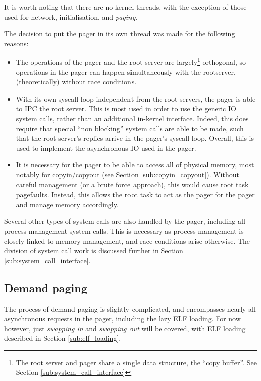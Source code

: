 \documentclass[12pt,english]{article}
\begin{document}
It is worth noting that there are no kernel threads, with the exception of those used for network, initialisation, and \emph{paging}.

The decision to put the pager in its own thread was made for the following reasons:
\begin{itemize}
\item The operations of the pager and the root server are largely\footnote{The root server and pager share a single data structure, the ``copy buffer''.  See Section \ref{sub:system_call_interface}} orthogonal, so operations in the pager can happen simultaneously with the rootserver, (theoretically) without race conditions.
\item With its own syscall loop independent from the root servers, the pager is able to IPC the root server.  This is most used in order to use the generic IO system calls, rather than an additional in-kernel interface.  Indeed, this does require that special ``non blocking'' system calls are able to be made, such that the root server's replies arrive in the pager's syscall loop.  Overall, this is used to implement the asynchronous IO used in the pager.
\item It is necessary for the pager to be able to access all of physical memory, most notably for copyin/copyout (see Section \ref{sub:copyin_copyout}).  Without careful management (or a brute force approach), this would cause root task pagefaults.  Instead, this allows the root task to act as the pager for the pager and manage memory accordingly.
\end{itemize}

Several other types of system calls are also handled by the pager, including all process management system calls.  This is necessary as process management is closely linked to memory management, and race conditions arise otherwise.  The division of system call work is discussed further in Section \ref{sub:system_call_interface}.

\subsection{Demand paging} \label{sub:demand_paging}

The process of demand paging is slightly complicated, and encompasses nearly all asynchronous requests in the pager, including the lazy ELF loading.  For now however, just \emph{swapping in} and \emph{swapping out} will be covered, with ELF loading described in Section \ref{sub:elf_loading}.
\end{document}
